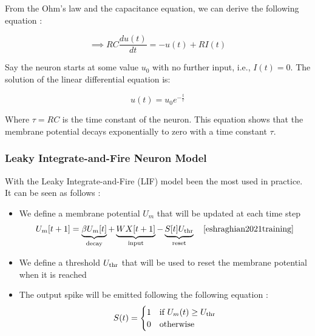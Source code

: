\documentclass[11pt]{article}
\begin{document}
From the Ohm's law and the capacitance equation, we can derive the following equation :

\begin{equation}
  \implies RC \frac{du(t)}{dt} = -u(t) + RI(t)
\end{equation}

Say the neuron starts at some value $u_{0}$ with no further input, i.e., $I(t)=0$. The solution of the linear differential equation is:

$$u(t) = u_0e^{-\frac{t}{\tau}}$$

Where $\tau = RC$ is the time constant of the neuron. This equation shows that the membrane potential decays exponentially to zero with a time constant $\tau$.

\subsubsection{Leaky Integrate-and-Fire Neuron Model}

With the Leaky Integrate-and-Fire (LIF) model been the most used in practice. It can be seen as follows :

\begin{itemize}
  \item We define a membrane potential $U_m$ that will be updated at each time step
        \begin{equation}
          U_m[t+1] = \underbrace{\beta U_m[t]}_\text{decay} + \underbrace{WX[t+1]}_\text{input} - \underbrace{S[t]U_{\rm thr}}_\text{reset}  \quad \text{\cite{eshraghian2021training}}
        \end{equation}

  \item We define a threshold $U_{\rm thr}$ that will be used to reset the membrane potential when it is reached
  \item The output spike will be emitted following the following equation :
        \begin{equation}
          S(t) = \begin{cases}
            1 & \text{if } U_m(t) \geq U_{\rm thr} \\
            0 & \text{otherwise}
          \end{cases}
        \end{equation}
\end{itemize}
\end{document}
